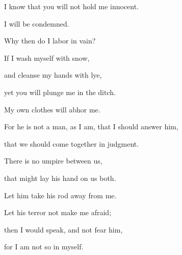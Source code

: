 {\par }{\QB I know that you will not hold me innocent.
\par }{\Q {}I will be condemned.
\par }{\QB Why then do I labor in vain?
\par }{\Q {}If I wash myself with snow,
\par }{\QB and cleanse my hands with lye,
\par }{\Q {}yet you will plunge me in the ditch.
\par }{\QB My own clothes will abhor me.
\par }{\Q {}For he is not a man, as I am, that I should answer him,
\par }{\QB that we should come together in judgment.
\par }{\Q {}There is no umpire between us,
\par }{\QB that might lay his hand on us both.
\par }{\Q {}Let him take his rod away from me.
\par }{\QB Let his terror not make me afraid;
\par }{\Q {}then I would speak, and not fear him,
\par }{\QB for I am not so in myself.
\par }{\BB \par }
